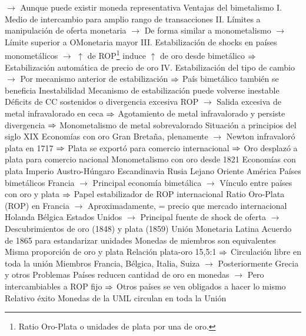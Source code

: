 \documentclass{nuevotema}
\begin{document}
\begin{esquemal}
				\4[] $\to$ Aunque puede existir moneda representativa
				\4 Ventajas del bimetalismo
				\4[] I. Medio de intercambio para amplio rango de transacciones
				\4[] II. Límites a manipulación de oferta monetaria
				\4[] $\to$ De forma similar a monometalismo
				\4[] $\to$ Límite superior a OMonetaria mayor
				\4[] III. Estabilización de shocks en países monometálicos
				\4[] $\to$ $\uparrow$ de ROP\footnote{Ratio Oro-Plata o unidades de plata por una de oro.} induce $\uparrow$ de oro desde bimetálico
				\4[] $\Rightarrow$ Estabilización automática de precio de oro
				\4[] IV. Estabilización del tipo de cambio
				\4[] $\to$ Por mecanismo anterior de estabilización
				\4[] $\Rightarrow$ País bimetálico también se beneficia
				\4 Inestabilidad
				\4[] Mecanismo de estabilización puede volverse inestable
				\4[] Déficits de CC sostenidos o divergencia excesiva ROP
				\4[] $\to$ Salida excesiva de metal infravalorado en ceca
				\4[] $\Rightarrow$ Agotamiento de metal infravalorado y persiste divergencia
				\4[] $\Rightarrow$ Monometalismo de metal sobrevalorado
			\3 Situación a principios del siglo XIX
				\4 Economías con oro
				\4[] Gran Bretaña, plenamente
				\4[] $\to$ Newton infravaloró plata en 1717
				\4[] $\Rightarrow$ Plata se exportó para comercio internacional
				\4[] $\Rightarrow$ Oro desplazó a plata para comercio nacional
				\4[] Monometalismo con oro desde 1821
				\4 Economías con plata
				\4[] Imperio Austro-Húngaro
				\4[] Escandinavia
				\4[] Rusia
				\4[] Lejano Oriente
				\4[] América
				\4 Países bimetálicos
				\4[] Francia
				\4[] $\to$ Principal economía bimetálica
				\4[] $\to$ Vínculo entre países con oro y plata
				\4[] $\Rightarrow$ Papel estabilizador de ROP internacional
				\4[] Ratio Oro-Plata (ROP) en Francia
				\4[] $\to$ Aproximadamente, = precio que mercado internacional
				\4[] Holanda
				\4[] Bélgica
				\4[] Estados Unidos
				\4[] $\to$ Principal fuente de shock de oferta
				\4[] $\to$ Descubrimientos de oro (1848) y plata (1859)
			\3 Unión Monetaria Latina
				\4 Acuerdo de 1865 para estandarizar unidades
				\4[] Monedas de miembros son equivalentes
				\4[] Misma proporción de oro y plata
				\4[] Relación plata-oro 15,5:1
				\4[] $\Rightarrow$ Circulación libre en toda la unión
				\4 Miembros
				\4[] Francia, Bélgica, Italia, Suiza
				\4[] $\to$ Posteriormente Grecia y otros
				\4 Problemas
				\4[] Países reducen cantidad de oro en monedas
				\4[] $\to$ Pero intercambiables a ROP fijo
				\4[] $\Rightarrow$ Otros países se ven obligados a hacer lo mismo
				\4 Relativo éxito
				\4[] Monedas de la UML circulan en toda la Unión

\end{esquemal}
\end{document}
